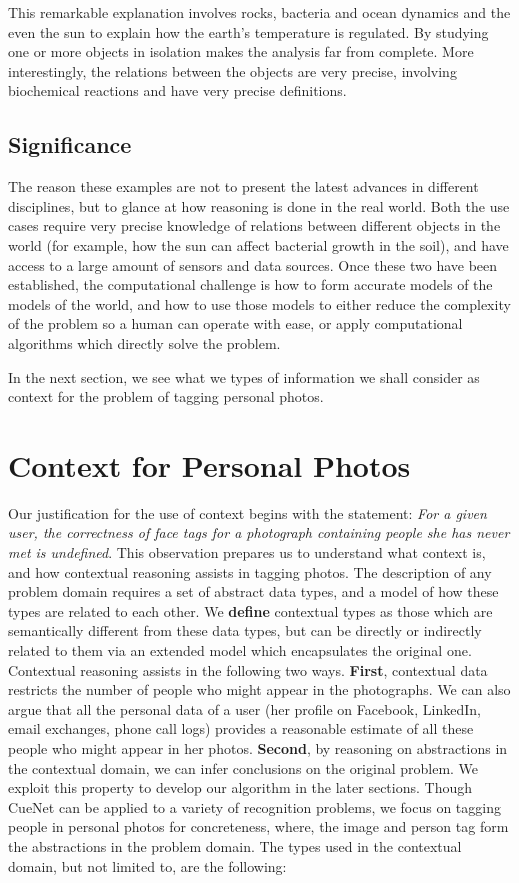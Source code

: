 This remarkable explanation involves rocks, bacteria and ocean dynamics and the even the sun to explain how the earth's temperature is regulated. By studying one or more objects in isolation makes the analysis far from complete. More interestingly, the relations between the objects are very precise, involving biochemical reactions and have very precise definitions.

\subsection{Significance}
The reason these examples are not to present the latest advances in different disciplines, but to glance at how reasoning is done in the real world. Both the use cases require very precise knowledge of relations between different objects in the world (for example, how the sun can affect bacterial growth in the soil), and have access to a large amount of sensors and data sources. Once these two have been established, the computational challenge is how to form accurate models of the models of the world, and how to use those models to either reduce the complexity of the problem so a human can operate with ease, or apply computational algorithms which directly solve the problem. 

In the next section, we see what we types of information we shall consider as context for the problem of tagging personal photos.

\section{Context for Personal Photos}
Our justification for the use of context begins with the statement: \textit{For a given user, the correctness of face tags for a photograph containing people she has never met is undefined}. This observation prepares us to understand what context is, and how contextual reasoning assists in tagging photos. The description of any problem domain requires a set of abstract data types, and a model of how these types are related to each other. We \textbf{define} contextual types as those which are semantically different from these data types, but can be directly or indirectly related to them via an extended model which encapsulates the original one. Contextual reasoning assists in the following two ways. \textbf{First}, contextual data restricts the number of people who might appear in the photographs. We can also argue that all the personal data of a user (her profile on Facebook, LinkedIn, email exchanges, phone call logs) provides a reasonable estimate of all these people who might appear in her photos. \textbf{Second}, by reasoning on abstractions in the contextual domain, we can infer conclusions on the original problem. We exploit this property to develop our algorithm in the later sections. Though CueNet can be applied to a variety of recognition problems, we focus on tagging people in personal photos for concreteness, where, the image and person tag form the abstractions in the problem domain. The types used in the contextual domain, but not limited to, are the following:

